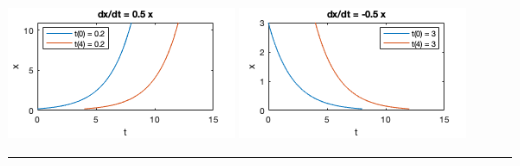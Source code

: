 \documentclass[12pt,letterpaper,noanswers]{exam}
\begin{document}
\includegraphics[width=0.45\textwidth]{img/C32p3.png}
\includegraphics[width=0.45\textwidth]{img/C32p3b.png}



\vspace{1in}










\vspace{0.2cm}
\hrule
\vspace{0.2cm}
\end{document}
